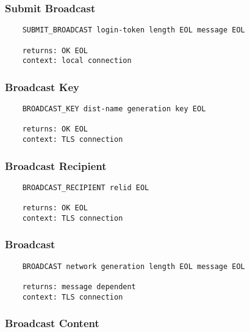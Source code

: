 \documentclass[letterpaper,11pt,oneside]{article}
\begin{document}
\subsubsection{Submit Broadcast}

\vspace{10pt}
\begin{verbatim}
    SUBMIT_BROADCAST login-token length EOL message EOL

    returns: OK EOL
    context: local connection
\end{verbatim}
\vspace{10pt}

\subsubsection{Broadcast Key}

\vspace{10pt}
\begin{verbatim}
    BROADCAST_KEY dist-name generation key EOL

    returns: OK EOL
    context: TLS connection
\end{verbatim}
\vspace{10pt}

\subsubsection{Broadcast Recipient}

\vspace{10pt}
\begin{verbatim}
    BROADCAST_RECIPIENT relid EOL

    returns: OK EOL
    context: TLS connection
\end{verbatim}
\vspace{10pt}

\subsubsection{Broadcast}

\vspace{10pt}
\begin{verbatim}
    BROADCAST network generation length EOL message EOL

    returns: message dependent
    context: TLS connection
\end{verbatim}
\vspace{10pt}

\subsubsection{Broadcast Content}
\end{document}
